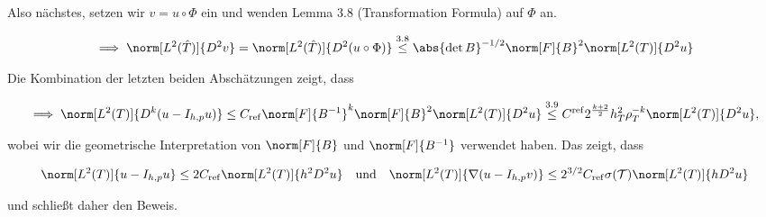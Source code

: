 \begin{solution}
\begin{enumerate}[label = \textbf{\alph*)}]
\begin{enumerate}[label = \arabic*.]
    Also nächstes, setzen wir $v = u \circ \Phi$ ein und wenden Lemma 3.8 (Transformation Formula) auf $\Phi$ an.

    \begin{align*}
      \implies
      \norm[L^2(\hat T)]{D^2 v}
      =
      \norm[L^2(\hat T)]{D^2 (u \circ \Phi)}
      \stackrel
      {
        \mathrm{3.8}
      }{\leq}
      \abs{\det B}^{-1/2} \norm[F]{B}^2 \norm[L^2(T)]{D^2 u}
    \end{align*}

    Die Kombination der letzten beiden Abschätzungen zeigt, dass

    \begin{align*}
      \implies
      \norm[L^2(T)]{D^k (u - I_{h, p} u)}
      \leq
      C_\mathrm{ref} \norm[F]{B^{-1}}^k \norm[F]{B}^2 \norm[L^2(T)]{D^2 u}
      \stackrel
      {
        \mathrm{3.9}
      }{\leq}
      C^\mathrm{ref} 2^\frac{k+2}{2} h_T^2 \rho_T^{-k} \norm[L^2(T)]{D^2 u},
    \end{align*}

    wobei wir die geometrische Interpretation von $\norm[F]{B}$ und $\norm[F]{B^{-1}}$ verwendet haben.
    Das zeigt, dass

    \begin{align*}
      \norm[L^2(T)]{u - I_{h, p} u}
      \leq
      2 C_\mathrm{ref} \norm[L^2(T)]{h^2 D^2 u}
      \quad
      \text{und}
      \quad
      \norm[L^2(T)]{\nabla (u - I_{h, p} v)}
      \leq 2^{3/2} C_\mathrm{ref} \sigma(\mathcal{T}) \norm[L^2(T)]{h D^2 u}
    \end{align*}

    und schließt daher den Beweis.

  \end{enumerate}

\end{enumerate}

\end{solution}

